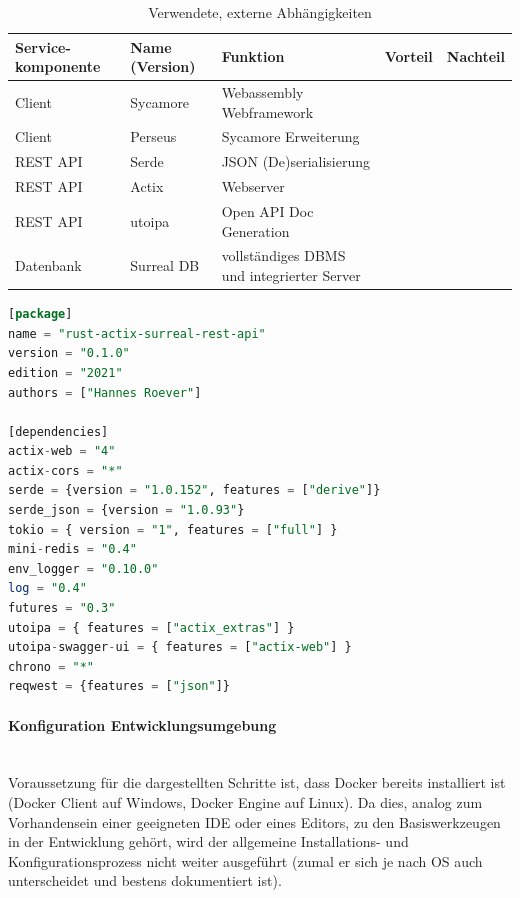 \documentclass[notitlepage, hidelinks]{article}
\begin{document}
\begin{table}[H]
\begin{center}
\begin{tabular}{| L{2cm} | L{2cm} | L{3.2cm} | L{3.2cm} | L{3.2cm} |}
\hline
Service- komponente & Name (Version) & Funktion & Vorteil & Nachteil \\ \hline
Client & Sycamore & Webassembly Webframework & & \\ \hline
Client & Perseus & Sycamore Erweiterung & & \\ \hline
REST API & Serde & JSON (De)serialisierung & & \\ \hline
REST API & Actix & Webserver & & \\ \hline
REST API & utoipa & Open API Doc Generation & & \\ \hline
Datenbank & Surreal DB & vollständiges DBMS und integrierter Server & & \\ \hline 
\end{tabular}
\caption{Verwendete, externe Abhängigkeiten}
\label{dependencies}
\end{center}
\end{table}


\begin{lstlisting}[language=SQL,frame=single,caption=cargo.toml Datei zur Organisation der Abhängigkeiten in Rust,label=toml]
[package]
name = "rust-actix-surreal-rest-api"
version = "0.1.0"
edition = "2021"
authors = ["Hannes Roever"]

[dependencies]
actix-web = "4"
actix-cors = "*"
serde = {version = "1.0.152", features = ["derive"]}
serde_json = {version = "1.0.93"}
tokio = { version = "1", features = ["full"] }
mini-redis = "0.4"
env_logger = "0.10.0"
log = "0.4"
futures = "0.3"
utoipa = { features = ["actix_extras"] }
utoipa-swagger-ui = { features = ["actix-web"] }
chrono = "*"
reqwest = {features = ["json"]}
\end{lstlisting}

\paragraph{Konfiguration Entwicklungsumgebung} \mbox{} \\
Voraussetzung für die dargestellten Schritte ist, dass Docker bereits installiert ist (Docker Client auf Windows, Docker Engine auf Linux). Da dies, analog zum Vorhandensein einer geeigneten IDE oder eines Editors, zu den Basiswerkzeugen in der Entwicklung gehört, wird der allgemeine Installations- und Konfigurationsprozess nicht weiter ausgeführt (zumal er sich je nach OS auch unterscheidet und bestens dokumentiert ist).
\end{document}
